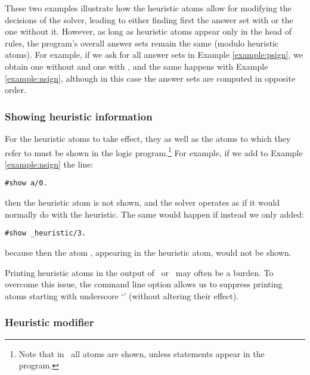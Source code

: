 These two examples illustrate how the heuristic atoms allow for modifying the decisions of the solver,
leading to either finding first the answer set with  or the one without it.
However, as long as heuristic atoms appear only in the head of rules,
the program's overall answer sets remain the same (modulo heuristic atoms).
For example, if we ask for all answer sets in Example \ref{example:psign},
we obtain one without  and one with ,
and the same happens with Example \ref{example:nsign}, 
although in this case the answer sets are computed in opposite order.

\subsubsection{Showing heuristic information}

For the heuristic atoms to take effect, they as well as the atoms to which they refer to
must be shown in the logic program.\footnote{Note that in \gringo\ all atoms are shown, 
  unless  statements appear in the program.}
For example, if we add to Example \ref{example:nsign} the line:
\begin{lstlisting}[numbers=none]
#show a/0.
\end{lstlisting}
then the heuristic atom is not shown, 
and the solver operates as if it would normally do with the  heuristic. 
The same would happen if instead we only added:
\begin{lstlisting}[numbers=none]
#show _heuristic/3.
\end{lstlisting}
because then the atom , appearing in the heuristic atom, would not be shown.

\begin{note}
Printing heuristic atoms in the output of \clingo\ or \clasp\ may often be a burden.
To overcome this issue,
the command line option  allows us to suppress printing atoms starting with underscore `\code{\_}'
(without altering their effect).
\end{note}

\subsubsection{Heuristic modifier }

